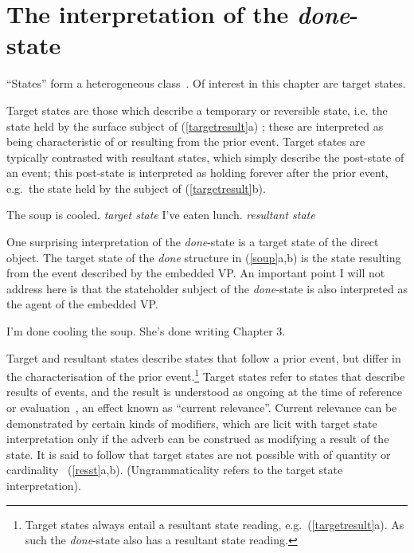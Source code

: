 \documentclass[output=paper,modfonts,nonflat]{langsci/langscibook}
\begin{document}
\section{The interpretation of the \emph{done}-state}\label{ssem}

\enquote{States} form a heterogeneous class~\citep[see
especially][]{Kratzer2001a}. Of interest in this chapter are target states.

Target states are those which describe a temporary or reversible state, i.e.
the state held by the surface subject of (\ref{targetresult}a)
\citep{Parsons1990a, Kratzer2001a}; these are interpreted as being
characteristic of or resulting from the prior event. Target states are
typically contrasted with resultant states, which simply describe the
post-state of an event; this post-state is interpreted as holding forever after
the prior event, e.g.\  the state held by the subject of
(\ref{targetresult}b).

\begin{exe}
\ex\label{targetresult}
\begin{xlist}
\ex The soup is cooled. \hfill \emph{target state}
\ex I've eaten lunch. \hfill \emph{resultant state}
\end{xlist}
\end{exe}

One surprising interpretation of the \emph{done}-state is a target state of the
direct object. The target state of the \emph{done} structure in (\ref{soup}a,b)
is the state resulting from the event described by the embedded VP\@. An
important point I will not address here is that the stateholder subject of the
\emph{done}-state is also interpreted as the agent of the embedded VP\@.

\begin{exe}
\ex\label{soup}
\begin{xlist}
\ex I'm done cooling the soup.
\ex She's done writing Chapter 3.
\end{xlist}
\end{exe}

Target and resultant states describe states that follow a prior event, but
differ in the characterisation of the prior event.\footnote{Target states
always entail a resultant state reading, e.g.\   (\ref{targetresult}a).  As
such the \emph{done}-state also has a resultant state reading.}  Target states
refer to states that describe results of events, and the result is understood
as ongoing at the time of reference or evaluation~\citep{Kratzer2001a}, an
effect known as \enquote{current relevance}. Current relevance can be
demonstrated by certain kinds of modifiers, which are licit with target state
interpretation only if the adverb can be construed as modifying a result of the
state. It is said to follow that target states are not possible with  of
quantity or cardinality~\citep{Mittwoch2008a} (\ref{resst}a,b).
(Ungrammaticality refers to the target state interpretation).
\end{document}
